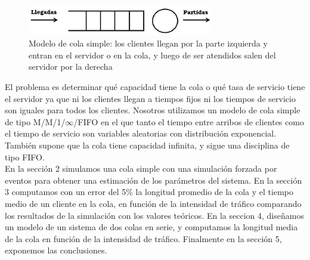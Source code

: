 \documentclass[10pt,journal,compsoc]{IEEEtran}
\begin{document}
\begin{figure}[t] %
\label{fig:colasimple}
\begin{center}
\centering
\includegraphics[width=3.2in]{cola2}
\caption{Modelo de cola simple: los clientes llegan por la parte izquierda y entran en el servidor o en la cola, y luego de ser atendidos salen del servidor por la derecha}
\end{center}
\end{figure}

El problema es determinar qu\'e capacidad tiene la cola o qu\'e tasa de servicio tiene el servidor ya
que ni los clientes llegan a tiempos fijos ni los tiempos de servicio son iguales para todos los
clientes. Nosotros utilizamos un modelo de cola simple de tipo M/M/1/$\infty$/FIFO en el que tanto el
tiempo entre arribos de clientes como el tiempo de servicio son variables aleatorias con distribuci\'on
exponencial. Tambi\'en supone que la cola tiene capacidad infinita, y sigue una disciplina de tipo FIFO.\\
En la secci\'on 2 simulamos una cola simple con una simulaci\'on forzada por eventos para obtener una
estimaci\'on de los par\'ametros del sistema. En la secci\'on 3 computamos con un error del 5\% la longitud
promedio de la cola y el tiempo medio de un cliente en la cola, en funci\'on de la intensidad de tr\'afico comparando los
resultados de la simulaci\'on con los valores te\'oricos. En la seccion 4, dise\~namos un modelo
de un sistema de dos colas en serie, y computamos la longitud media de la cola en funci\'on de la intensidad de tr\'afico.
Finalmente en la secci\'on 5, exponemos las conclusiones.


\end{document}
